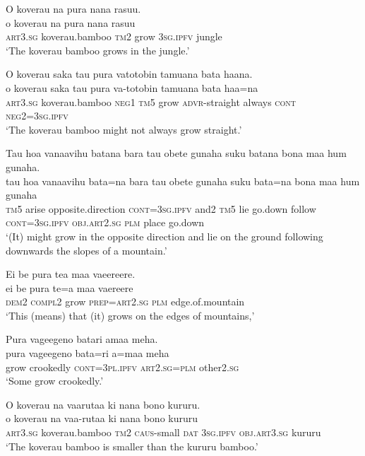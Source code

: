 \ea\label{ex:text6-1}
O koverau na pura nana rasuu.\\
\gll o	koverau	na	pura	nana	rasuu\\
     \textsc{art}3.\textsc{sg}	koverau.bamboo	\textsc{tm}2	grow	3\textsc{sg}.\textsc{ipfv}	jungle\\
\glt `The koverau bamboo grows in the jungle.'
\z

\ea\label{ex:text6-2}
O koverau saka tau pura vatotobin tamuana bata haana.\\
\gll o	koverau	saka	tau	pura	va-totobin	tamuana	bata	haa=na\\
     \textsc{art}3.\textsc{sg}	koverau.bamboo	\textsc{neg}1	\textsc{tm}5	grow	\textsc{advr}-straight	always	\textsc{cont}	\textsc{neg}2=3\textsc{sg}.\textsc{ipfv}\\
\glt `The koverau bamboo might not always grow straight.'
\z

\ea\label{ex:text6-3}
Tau hoa vanaavihu batana bara tau obete gunaha suku batana bona maa hum gunaha.\\
\gll tau	hoa	vanaavihu	bata=na	bara	tau	obete	gunaha	suku	bata=na	bona	maa	hum	gunaha\\
     \textsc{tm}5	arise	opposite.direction	\textsc{cont}=3\textsc{sg}.\textsc{ipfv}	and2	\textsc{tm}5	lie	go.down	follow	\textsc{cont}=3\textsc{sg}.\textsc{ipfv}	\textsc{obj}.\textsc{art}2.\textsc{sg}	\textsc{plm}	place	go.down\\
\glt `(It) might grow in the opposite direction and lie on the ground following downwards the slopes of a mountain.'
\z

\ea\label{ex:text6-4}
Ei be pura tea maa vaeereere.\\
\gll ei	be	pura	te=a	maa	vaereere\\
     \textsc{dem}2	\textsc{compl}2	grow	\textsc{prep}=\textsc{art}2.\textsc{sg}	\textsc{plm}	edge.of.mountain\\
\glt `This (means) that (it) grows on the edges of mountains,'
\z

\ea\label{ex:text6-5}
Pura vageegeno batari amaa meha.\\
\gll pura	vageegeno	bata=ri	a=maa	meha\\
     grow	crookedly	\textsc{cont}=3\textsc{pl}.\textsc{ipfv}	\textsc{art}2.\textsc{sg}=\textsc{plm}	other2.\textsc{sg}\\
\glt `Some grow crookedly.'
\z

\ea\label{ex:text6-6}
O koverau na vaarutaa ki nana bono kururu.\\
\gll o	koverau	na	vaa-rutaa	ki	nana	bono	kururu\\
     \textsc{art}3.\textsc{sg}	koverau.bamboo	\textsc{tm}2	\textsc{caus}-small	\textsc{dat}	3\textsc{sg}.\textsc{ipfv}	\textsc{obj}.\textsc{art}3.\textsc{sg}	kururu\\
\glt `The koverau bamboo is smaller than the kururu bamboo.'
\z

